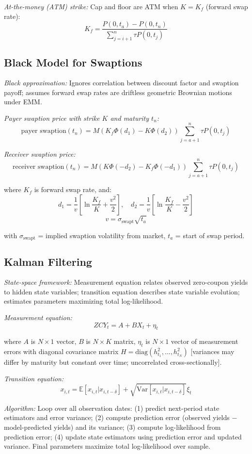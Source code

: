 \documentclass[12pt,a4paper]{article}
\begin{document}
\textit{At-the-money (ATM) strike:} Cap and floor are ATM when $K = K_f$ (forward swap rate):
$$K_f = \frac{P(0, t_a) - P(0, t_n)}{\sum_{j=i+1}^n \tau P(0, t_j)}$$

\subsection{Black Model for Swaptions}

\textit{Black approximation:} Ignores correlation between discount factor and swaption payoff; assumes forward swap rates are driftless geometric Brownian motions under EMM.

\textit{Payer swaption price with strike $K$ and maturity $t_n$:}
$$\text{payer swaption}(t_n) = M\left(K_f\Phi(d_1) - K\Phi(d_2)\right)\sum_{j=a+1}^n \tau P(0, t_j)$$

\textit{Receiver swaption price:}
$$\text{receiver swaption}(t_n) = M\left(K\Phi(-d_2) - K_f\Phi(-d_1)\right)\sum_{j=a+1}^n \tau P(0, t_j)$$

where $K_f$ is forward swap rate, and:
$$d_1 = \frac{1}{v}\left[\ln\frac{K_f}{K} + \frac{v^2}{2}\right], \quad d_2 = \frac{1}{v}\left[\ln\frac{K_f}{K} - \frac{v^2}{2}\right]$$
$$v = \sigma_{\text{swapt}}\sqrt{t_a}$$

with $\sigma_{\text{swapt}}$ = implied swaption volatility from market, $t_a$ = start of swap period.

\subsection{Kalman Filtering}

\textit{State-space framework:} Measurement equation relates observed zero-coupon yields to hidden state variables; transition equation describes state variable evolution; estimates parameters maximizing total log-likelihood.

\textit{Measurement equation:}
$$ZCY_t = A + BX_t + \eta_t$$

where $A$ is $N \times 1$ vector, $B$ is $N \times K$ matrix, $\eta_t$ is $N \times 1$ vector of measurement errors with diagonal covariance matrix $H = \text{diag}(h_{t_1}^2, \ldots, h_{t_N}^2)$ [variances may differ by maturity but constant over time; uncorrelated cross-sectionally].

\textit{Transition equation:}
$$x_{i,t} = \mathbb{E}[x_{i,t}|x_{i,t-\delta}] + \sqrt{\text{Var}[x_{i,t}|x_{i,t-\delta}]}\xi_t$$

\textit{Algorithm:} Loop over all observation dates: (1) predict next-period state estimators and error variance; (2) compute prediction error (observed yields $-$ model-predicted yields) and its variance; (3) compute log-likelihood from prediction error; (4) update state estimators using prediction error and updated variance. Final parameters maximize total log-likelihood over sample.
\end{document}

